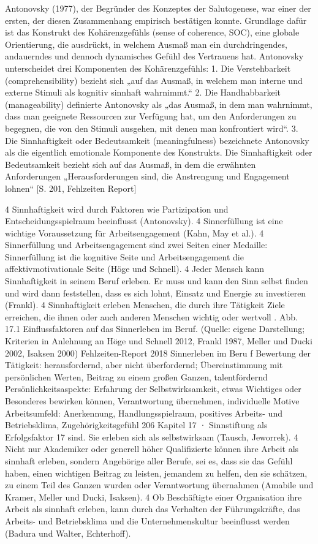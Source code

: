 Antonovsky (1977), der Begründer des Konzeptes der Salutogenese, war einer der ersten, der diesen Zusammenhang empirisch bestätigen konnte. Grundlage dafür ist das Konstrukt des Kohärenzgefühls (sense of coherence, SOC), eine globale Orientierung, die ausdrückt, in welchem Ausmaß man ein durchdringendes, andauerndes und dennoch dynamisches Gefühl des Vertrauens hat. Antonovsky unterscheidet drei Komponenten des Kohärenzgefühls: 1. Die Verstehbarkeit (comprehensibility) bezieht sich „auf das Ausmaß, in welchem man interne und externe Stimuli als kognitiv sinnhaft wahrnimmt.“ 2. Die Handhabbarkeit (manageability) definierte Antonovsky als „das Ausmaß, in dem man wahrnimmt, dass man geeignete Ressourcen zur Verfügung hat, um den Anforderungen zu begegnen, die von den Stimuli ausgehen, mit denen man konfrontiert wird“. 3. Die Sinnhaftigkeit oder Bedeutsamkeit (meaningfulness) bezeichnete Antonovsky als die eigentlich emotionale Komponente des Konstrukts. Die Sinnhaftigkeit oder Bedeutsamkeit bezieht sich auf das Ausmaß, in dem die erwähnten Anforderungen „Herausforderungen sind, die Anstrengung und Engagement lohnen“ [S. 201, Fehlzeiten Report]
 

4 Sinnhaftigkeit wird durch Faktoren wie Partizipation und Entscheidungsspielraum beeinflusst (Antonovsky). 4 Sinnerfüllung ist eine wichtige Voraussetzung für Arbeitsengagement (Kahn, May et al.). 4 Sinnerfüllung und Arbeitsengagement sind zwei Seiten einer Medaille: Sinnerfüllung ist die kognitive Seite und Arbeitsengagement die affektivmotivationale Seite (Höge und Schnell). 4 Jeder Mensch kann Sinnhaftigkeit in seinem Beruf erleben. Er muss und kann den Sinn selbst finden und wird dann feststellen, dass es sich lohnt, Einsatz und Energie zu investieren (Frankl). 4 Sinnhaftigkeit erleben Menschen, die durch ihre Tätigkeit Ziele erreichen, die ihnen oder auch anderen Menschen wichtig oder wertvoll . Abb. 17.1 Einflussfaktoren auf das Sinnerleben im Beruf. (Quelle: eigene Darstellung; Kriterien in Anlehnung an Höge und Schnell 2012, Frankl 1987, Meller und Ducki 2002, Isaksen 2000) Fehlzeiten-Report 2018 Sinnerleben im Beru f Bewertung der Tätigkeit: herausfordernd, aber nicht überfordernd; Übereinstimmung mit persönlichen Werten, Beitrag zu einem großen Ganzen, talentfördernd Persönlichkeitsaspekte: Erfahrung der Selbstwirksamkeit, etwas Wichtiges oder Besonderes bewirken können, Verantwortung übernehmen, individuelle Motive Arbeitsumfeld: Anerkennung, Handlungsspielraum, positives Arbeits- und Betriebsklima, Zugehörigkeitsgefühl 206 Kapitel 17 · Sinnstiftung als Erfolgsfaktor 17 sind. Sie erleben sich als selbstwirksam (Tausch, Jeworrek). 4 Nicht nur Akademiker oder generell höher Qualifizierte können ihre Arbeit als sinnhaft erleben, sondern Angehörige aller Berufe, sei es, dass sie das Gefühl haben, einen wichtigen Beitrag zu leisten, jemandem zu helfen, den sie schätzen, zu einem Teil des Ganzen wurden oder Verantwortung übernahmen (Amabile und Kramer, Meller und Ducki, Isaksen). 4 Ob Beschäftigte einer Organisation ihre Arbeit als sinnhaft erleben, kann durch das Verhalten der Führungskräfte, das Arbeits- und Betriebsklima und die Unternehmenskultur beeinflusst werden (Badura und Walter, Echterhoff).

